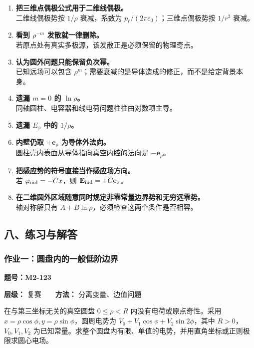 \begin{enumerate}
\def\labelenumi{\arabic{enumi}.}
\item
  \textbf{把三维点偶极公式用于二维线偶极。}\\
  二维线偶极势按 \(1/\rho\) 衰减，系数为
  \(p_{\ell}/(2\pi\varepsilon_0)\)；三维点偶极势按 \(1/r^2\) 衰减。
\item
  \textbf{看到 \(\rho^{-m}\) 发散就一律删除。}\\
  若原点处有真实多极源，该发散正是必须保留的物理奇点。
\item
  \textbf{认为圆外问题只能保留负次幂。}\\
  已知远场可以包含
  \(\rho^m\)；需要衰减的是导体造成的修正，而不是给定背景本身。
\item
  \textbf{遗漏 \(m=0\) 的 \(\ln\rho\)。}\\
  同轴圆柱、电容器和线电荷问题往往由对数项主导。
\item
  \textbf{遗漏 \(E_{\phi}\) 中的 \(1/\rho\)。}
\item
  \textbf{内壁仍取 \(+\mathbf e_{\rho}\) 为导体外法向。}\\
  圆柱壳内表面从导体指向真空内腔的法向是 \(-\mathbf e_{\rho}\)。
\item
  \textbf{把感应势的符号直接当作感应场方向。}\\
  若 \(\varphi_{\rm ind}=-Cx\)，则
  \(\mathbf E_{\rm ind}=+C\mathbf e_x\)。
\item
  \textbf{在二维圆外区域随意同时规定非零常量边界势和无穷远零势。}\\
  轴对称解只有 \(A+B\ln\rho\)，必须检查这两个条件是否相容。
\end{enumerate}

\subsection{八、练习与解答}\label{m2:ux516bux7ec3ux4e60ux4e0eux89e3ux7b54-5}

\subsubsection{作业一：圆盘内的一般低阶边界}\label{m2:ux4f5cux4e1aux4e00ux5706ux76d8ux5185ux7684ux4e00ux822cux4f4eux9636ux8fb9ux754c}

\textbf{题号：M2-123}

\textbf{层级：} 复赛　　\textbf{方法：} 分离变量、边值问题

在与第三坐标无关的真空圆盘 \(0\le\rho<R\) 内没有电荷或原点奇性。采用
\(x=\rho\cos\phi,y=\rho\sin\phi\)，圆周电势为
\(V_0+V_1\cos\phi+V_2\sin2\phi\)，其中 \(R>0\)，\(V_0,V_1,V_2\)
为已知常量。求整个圆盘内有限、单值的电势，并用直角坐标或正则极限求圆心电场。

